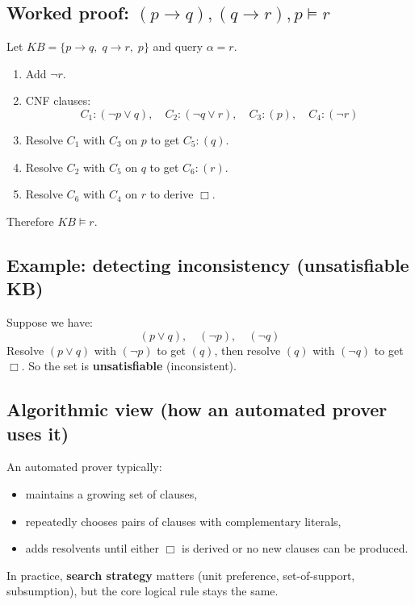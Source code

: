 \documentclass[11pt]{article}
\begin{document}
\subsection{Worked proof: $(p\rightarrow q),(q\rightarrow r), p \models r$}
Let $KB=\{p\rightarrow q,\; q\rightarrow r,\; p\}$ and query $\alpha=r$.
\begin{enumerate}[leftmargin=*]
  \item Add $\lnot r$.
  \item CNF clauses:
  \[
    C_1:(\lnot p \lor q),\quad
    C_2:(\lnot q \lor r),\quad
    C_3:(p),\quad
    C_4:(\lnot r)
  \]
  \item Resolve $C_1$ with $C_3$ on $p$ to get $C_5:(q)$.
  \item Resolve $C_2$ with $C_5$ on $q$ to get $C_6:(r)$.
  \item Resolve $C_6$ with $C_4$ on $r$ to derive $\Box$.
\end{enumerate}
Therefore $KB \models r$.

\subsection{Example: detecting inconsistency (unsatisfiable KB)}
Suppose we have:
\[
  (p \lor q),\quad (\lnot p),\quad (\lnot q)
\]
Resolve $(p \lor q)$ with $(\lnot p)$ to get $(q)$, then resolve $(q)$ with $(\lnot q)$ to get $\Box$.
So the set is \textbf{unsatisfiable} (inconsistent).

\subsection{Algorithmic view (how an automated prover uses it)}
An automated prover typically:
\begin{itemize}[leftmargin=*]
  \item maintains a growing set of clauses,
  \item repeatedly chooses pairs of clauses with complementary literals,
  \item adds resolvents until either $\Box$ is derived or no new clauses can be produced.
\end{itemize}
In practice, \textbf{search strategy} matters (unit preference, set-of-support, subsumption), but the core logical rule stays the same.
\end{document}
